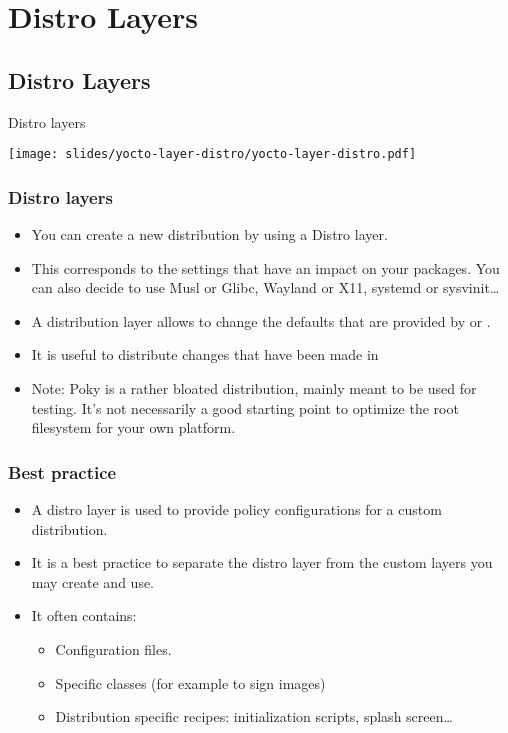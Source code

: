 \section{Distro Layers}

\subsection{Distro Layers}

\begin{frame}{Distro layers}
  \begin{center}
    \texttt{[image: slides/yocto-layer-distro/yocto-layer-distro.pdf]}
  \end{center}
\end{frame}

\begin{frame}
  \frametitle{Distro layers}
  \begin{itemize}
    \item You can create a new distribution by using a Distro layer.
    \item This corresponds to the settings that have an impact on your
          packages. You can also decide to use Musl or Glibc, Wayland
          or X11, systemd or sysvinit\dots
    \item A distribution layer allows to change the defaults that are provided by
       or .
    \item It is useful to distribute changes that have been made in
    \item Note: Poky is a rather bloated distribution, mainly meant to
          be used for testing. It's not necessarily a good starting
          point to optimize the root filesystem for your own platform.
  \end{itemize}
\end{frame}

\begin{frame}
  \frametitle{Best practice}
  \begin{itemize}
    \item A distro layer is used to provide policy configurations for
      a custom distribution.
    \item It is a best practice to separate the distro layer from the
      custom layers you may create and use.
    \item It often contains:
      \begin{itemize}
        \item Configuration files.
        \item Specific classes (for example to sign images)
        \item Distribution specific recipes: initialization scripts,
          splash screen\dots
      \end{itemize}
  \end{itemize}
\end{frame}


